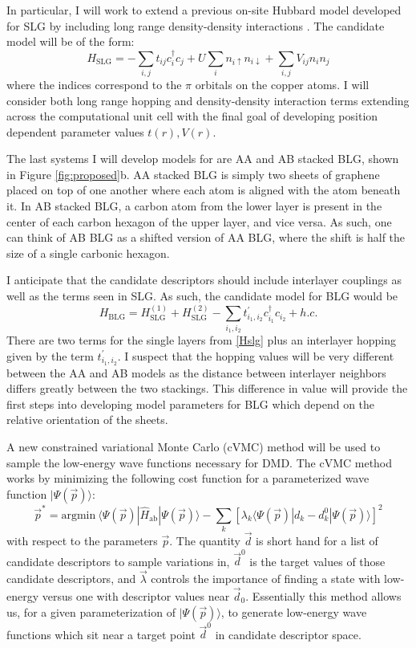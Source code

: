 \documentclass[12pt]{article}
\begin{document}
In particular, I will work to extend a previous on-site Hubbard model developed for SLG \cite{Zheng2017, Wagner2015} by including long range density-density interactions .
The candidate model will be of the form:
\begin{equation}
H_\text{SLG} = -\sum_{i,j} t_{ij}c_i^\dagger c_j + U \sum_i n_{i\uparrow}n_{i\downarrow}  + \sum_{i,j} V_{ij} n_i n_j
\label{Hslg}
\end{equation}
where the indices correspond to the $\pi$ orbitals on the copper atoms.
I will consider both long range hopping and density-density interaction terms extending across the computational unit cell with the final goal of developing position dependent parameter values $t(r), V(r)$.

The last systems I will develop models for are AA and AB stacked BLG, shown in Figure \ref{fig:proposed}b.
AA stacked BLG is simply two sheets of graphene placed on top of one another where each atom is aligned with the atom beneath it.
In AB stacked BLG, a carbon atom from the lower layer is present in the center of each carbon hexagon of the upper layer, and vice versa.
As such, one can think of AB BLG as a shifted version of AA BLG, where the shift is half the size of a single carbonic hexagon.

I anticipate that the candidate descriptors should include interlayer couplings as well as the terms seen in SLG.
As such, the candidate model for BLG would be
\begin{equation}
H_\text{BLG} = H_\text{SLG}^{(1)} + H_\text{SLG}^{(2)} - \sum_{i_1, i_2} t_{i_1, i_2}^\prime c_{i_1}^\dagger c_{i_2} + h.c.
\label{Hblg}
\end{equation}
There are two terms for the single layers from \eqref{Hslg} plus an interlayer hopping given by the term $t_{i_1, i_2}^\prime.$
I suspect that the hopping values will be very different between the AA and AB models as the distance between interlayer neighbors differs greatly between the two stackings.
This difference in value will provide the first steps into developing model parameters for BLG which depend on the relative orientation of the sheets.

A new constrained variational Monte Carlo (cVMC) method will be used to sample the low-energy wave functions necessary for DMD.
The cVMC method works by minimizing the following cost function for a parameterized wave function $|\Psi(\vec{p})\rangle$:
\begin{equation}
\vec{p}^* = \text{argmin} \ \langle \Psi(\vec{p}) | \hat{H}_\text{ab} | \Psi(\vec{p}) \rangle - \sum_k [\lambda_k \langle \Psi(\vec{p}) | d_k - d_{k}^0 | \Psi(\vec{p}) \rangle]^2
\end{equation}
with respect to the parameters $\vec{p}$.
The quantity $\vec{d}$ is short hand for a list of candidate descriptors to sample variations in, $\vec{d}^0$ is the target values of those candidate descriptors, and $\vec{\lambda}$ controls the importance of finding a state with low-energy versus one with descriptor values near $\vec{d}_0$.
Essentially this method allows us, for a given parameterization of $|\Psi(\vec{p})\rangle$, to generate low-energy wave functions which sit near a target point $\vec{d}^0$ in candidate descriptor space.
\end{document}
